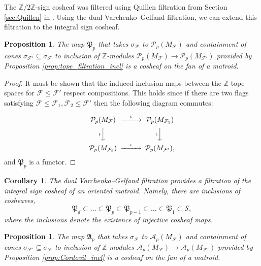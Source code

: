 \documentclass{amsart}
\newtheorem{proposition}[theorem]{Proposition}
\newtheorem{corollary}[theorem]{Corollary}
\newcommand\Acal{{\mathcal A}}
\newcommand\Fcal{{\mathcal F}}
\newcommand\Pcal{{\mathcal P}}
\newcommand\ZZ{{\mathbb Z}}
\newcommand\Ztwo{{\mathbb Z}/2{\mathbb Z}}
\newcommand\Pfrak{{\mathfrak P}}
\begin{document}
{ The $\Ztwo$-sign cosheaf was filtered using Quillen filtration from Section \ref{sec:Quillen} in \cite{RS, RRS}.
Using the dual Varchenko--Gelfand filtration, we can extend this filtration to the integral sign cosheaf.


\begin{proposition}\label{prop:GVcosheaf}
    The map $\Pfrak_p$ that takes $\sigma_\Fcal$ to $\Pcal_p(M_\Fcal)$ and containment of cones $\sigma_{\mathcal{F}'} \subseteq \sigma_{\mathcal{F}}$ to inclusion of $\ZZ$-modules $\Pcal_p(M_\Fcal)\rightarrow \Pcal_p(M_{\Fcal'})$ provided by Proposition \ref{prop:tope_filtration_incl} is a cosheaf on the fan of a matroid.
\end{proposition}


\begin{proof}
    It must be shown that the induced inclusion maps between the $\ZZ$-tope spaces for $\Fcal \leq \Fcal'$ respect compositions. This holds since if there are two flags satisfying $\Fcal \leq \Fcal_1,\Fcal_2 \leq \Fcal'$ then the following diagram commutes: 

   \begin{equation} \label{eq:VGSheaf}
\begin{CD}
\Pcal_p(M_{\Fcal})     @>\iota>>  \Pcal_p(M_{\Fcal_1}) \\
@V\iota VV        @V\iota VV\\
\Pcal_p(M_{\Fcal_2})    @>\iota>> \Pcal_p(M_{\Fcal'}),
\end{CD}
\end{equation}
and $\mathfrak{P}_p$ is a functor. 
\end{proof}


\begin{corollary}\label{cor:cosheafFiltration}
The dual Varchenko--Gelfand filtration provides a filtration of the integral sign cosheaf of an oriented matroid. Namely, there are inclusions of cosheaves, 
$$\Pfrak_d  \subset  \dots \subset \Pfrak_p \subset \Pfrak_{p-1} \subset \dots \subset \Pfrak_1 \subset \mathcal{S},$$ where the inclusions denote the existence of injective cosheaf maps. 
\end{corollary}


\begin{proposition}\label{prop:CordovilCosheaf}
    The map $\mathfrak{A}_p$ that takes $\sigma_\Fcal$ to $\Acal_p(M_\Fcal)$ and containment of cones $\sigma_{\mathcal{F}'} \subseteq \sigma_{\mathcal{F}}$ to inclusion of $\ZZ$-modules $\Acal_p(M_\Fcal)\rightarrow \Acal_p(M_{\Fcal'})$ provided by Proposition \ref{prop:Cordovil_incl} is a cosheaf on the fan of a matroid.
\end{proposition}

}
\end{document}
